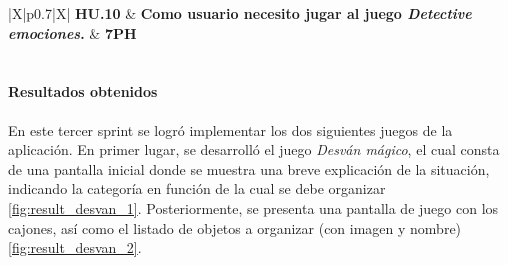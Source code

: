 \begin{table}[H]
\renewcommand{\arraystretch}{1.3}
\setlength{\tabcolsep}{10pt}
\vspace{0.8em}
\centering
\begin{tabularx}{\textwidth}{|X|p{}|X|}
    \hline
    \textbf{HU.10} & \textbf{Como usuario necesito jugar al juego \textit{Detective emociones}.} & \textbf{7PH} \\
    \hline
     \\
    \hline
\end{tabularx}
\caption{HU.10 - Jugar al juego \textit{Detective emociones} - Desglose de tareas}
\vspace{0.8em}
\end{table}

\paragraph{Resultados obtenidos}
En este tercer sprint se logró implementar los dos siguientes juegos de la aplicación.
En primer lugar, se desarrolló el juego \textit{Desván mágico}, el cual consta de una pantalla inicial donde se muestra una breve explicación de la situación, indicando la categoría en función de la cual se debe organizar \cref{fig:result_desvan_1}.
Posteriormente, se presenta una pantalla de juego con los cajones, así como el listado de objetos a organizar (con imagen y nombre) \cref{fig:result_desvan_2}.

